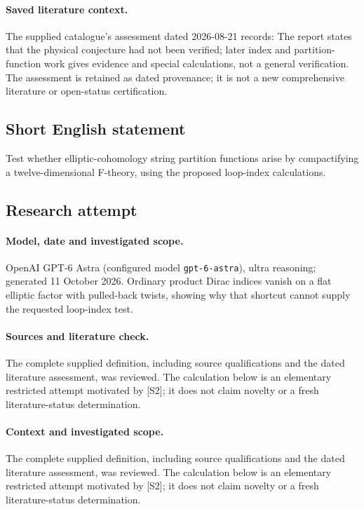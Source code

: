 \documentclass[11pt]{article}
\begin{document}
\paragraph{Saved literature context.} The supplied catalogue's assessment dated 2026-08-21 records: The report states that the physical conjecture had not been verified; later index and partition-function work gives evidence and special calculations, not a general verification. The assessment is retained as dated provenance; it is not a new comprehensive literature or open-status certification.
\subsection{Short English statement}
Test whether elliptic-cohomology string partition functions arise by compactifying a twelve-dimensional F-theory, using the proposed loop-index calculations.
\subsection{Research attempt}
\paragraph{Model, date and investigated scope.}
OpenAI GPT-6 Astra (configured model \texttt{gpt-6-astra}), ultra reasoning; generated 11 October 2026. Ordinary product Dirac indices vanish on a flat elliptic factor with pulled-back twists, showing why that shortcut cannot supply the requested loop-index test.

\paragraph{Sources and literature check.}
The complete supplied definition, including source qualifications and the dated literature assessment, was reviewed. The calculation below is an elementary restricted attempt motivated by [S2]; it does not claim novelty or a fresh literature-status determination.

\paragraph{Context and investigated scope.} The complete supplied definition, including source qualifications and the dated literature assessment, was reviewed. The calculation below is an elementary restricted attempt motivated by [S2]; it does not claim novelty or a fresh literature-status determination.
\end{document}
